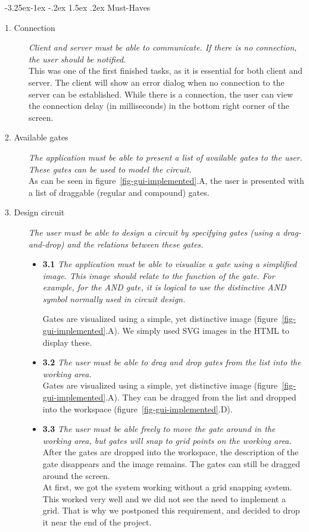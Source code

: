 \documentclass[a4paper]{article}
\makeatletter
\renewcommand\paragraph{\@startsection{paragraph}{4}{\z@}%
  {-3.25ex\@plus -1ex \@minus -.2ex}%
  {1.5ex \@plus .2ex}%
  {\normalfont\normalsize\bfseries}}
\makeatother
\begin{document}
\paragraph{Must-Haves}
\begin{description}
\item[1. Connection] \textit{Client and server must be able to communicate. If there is no connection, the user should be notified.}\\
This was one of the first finished tasks, as it is essential for both client and server. The client will show an error dialog when no connection to the server can be established. While there is a connection, the user can view the connection delay (in milliseconds) in the bottom right corner of the screen.

\item[2. Available gates] \textit{The application must be able to present a list of available gates to the user. These gates can be used to model the circuit.}\\
As can be seen in figure~\ref{fig-gui-implemented}.A, the user is presented with a list of draggable (regular and compound) gates.

\item[3. Design circuit] \textit{The user must be able to design a circuit by specifying gates (using a drag-and-drop) and the relations between these gates.}
	\begin{itemize}
	\item \textbf{3.1} \textit{The application must be able to visualize a gate using a simplified image. This image should relate to the function of the gate. For example, for the AND gate, it is logical to use the distinctive AND symbol normally used in circuit design.}
	
	Gates are visualized using a simple, yet distinctive image (figure~\ref{fig-gui-implemented}.A). We simply used SVG images in the HTML to display these.

	\item \textbf{3.2} \textit{The user must be able to drag and drop gates from the list into the working area.}\\
	Gates are visualized using a simple, yet distinctive image (figure~\ref{fig-gui-implemented}.A). They can be dragged from the list and dropped into the workspace (figure~\ref{fig-gui-implemented}.D).

	\item \textbf{3.3} \textit{The user must be able freely to move the gate around in the working area, but gates will snap to grid points on the working area.}\\
	After the gates are dropped into the workspace, the description of the gate disappears and the image remains. The gates can still be dragged around the screen.\\
	At first, we got the system working without a grid snapping system. This worked very well and we did not see the need to implement a grid. That is why we postponed this requirement, and decided to drop it near the end of the project.


\end{itemize}
\end{description}
\end{document}
